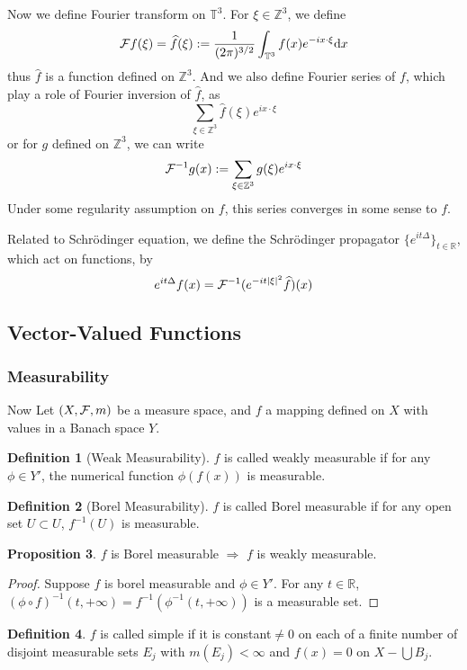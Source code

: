 \documentclass{article}
\theoremstyle{definition}
\newtheorem{definition}{Definition}[subsection]
\newtheorem{proposition}[definition]{Proposition}
\theoremstyle{remark}
\newcommand{\dif}{\mathrm{d}}
\begin{document}
Now we define Fourier transform on $\mathbb{T}^3$. For $\xi\in\mathbb{Z}^3$, we define
$${\cal F}f(\xi)=\widehat{f}(\xi):=\frac{1}{(2\pi)^{3/2}}\int_{\mathbb{T}^3}f(x)e^{-ix\cdot\xi}\dif x$$
thus $\widehat{f}$ is a function defined on $\mathbb{Z}^3$. And we also define Fourier series of $f$, which play a role of Fourier inversion of $\widehat{f}$, as
$$\sum_{\xi\in\mathbb{Z}^3}\widehat{f}(\xi)e^{ix\cdot\xi}$$
or for $g$ defined on $\mathbb{Z}^3$, we can write
$${\cal F}^{-1}g(x):=\sum_{\xi\in\mathbb{Z}^3}g(\xi)e^{ix\cdot\xi}$$
Under some regularity assumption on $f$, this series converges in some sense to $f$. 

Related to Schr\"odinger equation, we define the Schr\"odinger propagator $\{e^{it\Delta}\}_{t\in\mathbb{R}}$, which act on functions, by
$$e^{it\Delta}f(x)={\cal F}^{-1}(e^{-it|\xi|^2}\widehat{f})(x)$$

\subsection{Vector-Valued Functions}
\subsubsection{Measurability}
Now Let $(X,{\cal F},m)$ be a measure space, and $f$ a mapping defined on $X$ with values in a Banach space $Y$. 

\begin{definition}[Weak Measurability]
$f$ is called weakly measurable if for any $\phi\in Y'$, the numerical function $\phi(f(x))$ is measurable. 
\end{definition}

\begin{definition}[Borel Measurability]
$f$ is called Borel measurable if for any open set $U\subset U$, $f^{-1}(U)$ is measurable. 
\end{definition}

\begin{proposition}
$f$ is Borel measurable $\Rightarrow$ $f$ is weakly measurable. 
\end{proposition}
\begin{proof}
Suppose $f$ is borel measurable and $\phi\in Y'$. For any $t\in\mathbb{R}$, $(\phi\circ f)^{-1}(t,+\infty)=f^{-1}(\phi^{-1}(t,+\infty))$ is a measurable set. 
\end{proof}

\begin{definition}
$f$ is called simple if it is constant$\ne0$ on each of a finite number of disjoint measurable sets $E_j$ with $m(E_j)<\infty$ and $f(x)=0$ on $X-\bigcup B_j$. 
\end{definition}
\end{document}
